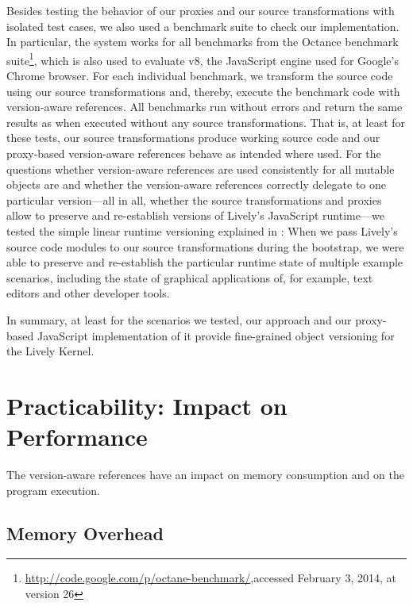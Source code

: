 Besides testing the behavior of our proxies and our source transformations with isolated test cases, we also used a benchmark suite to check our implementation.
In particular, the system works for all benchmarks from the Octance benchmark suite\footnote{\url{http://code.google.com/p/octane-benchmark/},\goodbreak accessed February 3, 2014, at version 26}, which is also used to evaluate v8, the JavaScript engine used for Google's Chrome browser.
For each individual benchmark, we transform the source code using our source transformations and, thereby, execute the benchmark code with version-aware references.
All benchmarks run without errors and return the same results as when executed without any source transformations.
That is, at least for these tests, our source transformations produce working source code and our proxy-based version-aware references behave as intended where used.
For the questions whether version-aware references are used consistently for all mutable objects are and whether the version-aware references correctly delegate to one particular version---all in all, whether the source transformations and proxies allow to preserve and re-establish versions of Lively's JavaScript runtime---we tested the simple linear runtime versioning explained in :
When we pass Lively's source code modules to our source transformations during the bootstrap, we were able to preserve and re-establish the particular runtime state of multiple example scenarios, including the state of graphical applications of, for example, text editors and other developer tools.

In summary, at least for the scenarios we tested, our approach and our proxy-based JavaScript implementation of it provide fine-grained object versioning for the Lively Kernel.



\section{Practicability: Impact on Performance}

The version-aware references have an impact on memory consumption and on the program execution.

\subsection{Memory Overhead}

